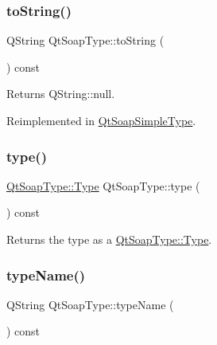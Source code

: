 \mbox{\label{class_qt_soap_type_a253d268332ea0b2ebba6ee52522fa685}} 
\subsubsection{\texorpdfstring{to\+String()}{toString()}}
{\footnotesize\ttfamily Q\+String Qt\+Soap\+Type\+::to\+String (\begin{DoxyParamCaption}{ }\end{DoxyParamCaption}) const\hspace{0.3cm}{\ttfamily [virtual]}}

Returns Q\+String\+::null. 

Reimplemented in \mbox{\hyperlink{class_qt_soap_simple_type_aeb17c8605fc09bcde232f11a6f91f775}{Qt\+Soap\+Simple\+Type}}.

\mbox{\label{class_qt_soap_type_acd4282b8a4b6a709c3504cc976335fba}} 
\subsubsection{\texorpdfstring{type()}{type()}}
{\footnotesize\ttfamily \mbox{\hyperlink{class_qt_soap_type_a840b69f1d92eeb4e64ae1e0439d54683}{Qt\+Soap\+Type\+::\+Type}} Qt\+Soap\+Type\+::type (\begin{DoxyParamCaption}{ }\end{DoxyParamCaption}) const\hspace{0.3cm}{\ttfamily [virtual]}}

Returns the type as a \mbox{\hyperlink{class_qt_soap_type_a840b69f1d92eeb4e64ae1e0439d54683}{Qt\+Soap\+Type\+::\+Type}}. \mbox{\label{class_qt_soap_type_a5e5fc74b7b3e614d9db6cc0c4bbf9dbf}} 
\subsubsection{\texorpdfstring{type\+Name()}{typeName()}}
{\footnotesize\ttfamily Q\+String Qt\+Soap\+Type\+::type\+Name (\begin{DoxyParamCaption}{ }\end{DoxyParamCaption}) const\hspace{0.3cm}{\ttfamily [virtual]}}

